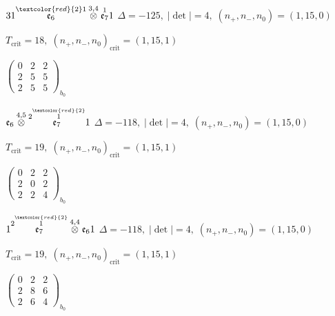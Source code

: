 \documentclass[10pt]{article}
\begin{document}
\smallskip

$31\overset{\textcolor{red}{2}1}{\mathfrak{e}_6}\overset{3,4}{\otimes}\overset{1}{\mathfrak{e}_7}1$ \quad $\Delta=-125,\; |\det|=4,\; (n_+,n_-,n_0)=(1,15,0)$

\hspace{1em}$T_{\text{crit}}=18,\; (n_+,n_-,n_0)_{\text{crit}}=(1,15,1)$

\hspace{2em}$\left(\begin{smallmatrix}0 & 2 & 2 \\ 2 & 5 & 5 \\ 2 & 5 & 5\end{smallmatrix}\right)_{\!b_0}$

\smallskip

$\mathfrak{e}_6\overset{4,5}{\otimes}\overset{2\overset{\textcolor{red}{2}}{1}}{\mathfrak{e}_7}1$ \quad $\Delta=-118,\; |\det|=4,\; (n_+,n_-,n_0)=(1,15,0)$

\hspace{1em}$T_{\text{crit}}=19,\; (n_+,n_-,n_0)_{\text{crit}}=(1,15,1)$

\hspace{2em}$\left(\begin{smallmatrix}0 & 2 & 2 \\ 2 & 0 & 2 \\ 2 & 2 & 4\end{smallmatrix}\right)_{\!b_0}$

\smallskip

$1\overset{2\overset{\textcolor{red}{2}}{1}}{\mathfrak{e}_7}\overset{4,4}{\otimes}\mathfrak{e}_61$ \quad $\Delta=-118,\; |\det|=4,\; (n_+,n_-,n_0)=(1,15,0)$

\hspace{1em}$T_{\text{crit}}=19,\; (n_+,n_-,n_0)_{\text{crit}}=(1,15,1)$

\hspace{2em}$\left(\begin{smallmatrix}0 & 2 & 2 \\ 2 & 8 & 6 \\ 2 & 6 & 4\end{smallmatrix}\right)_{\!b_0}$

\smallskip
\end{document}
